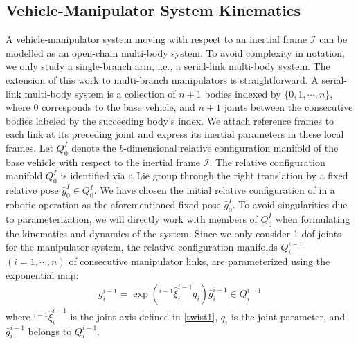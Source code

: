 \documentclass[lettersize,journal]{IEEEtran}
\def \SE {\textbf{SE}(3)}
\def  \B {\mathcal{B}}
\theoremstyle{remark}
\begin{document}
\subsection{Vehicle-Manipulator System Kinematics}\label{kinematics}
A vehicle-manipulator system moving with respect to an inertial frame $\mathcal{I}$ can be modelled as an open-chain multi-body system. To avoid complexity in notation, we only study a single-branch arm, i.e., a serial-link multi-body system. The extension of this work to multi-branch manipulators is straightforward. A serial-link multi-body system is a collection of $n+1$ bodies indexed by $\{0,1,\cdots, n\}$, where $0$ corresponds to the base vehicle, and $n+1$ joints between the consecutive bodies labeled by the succeeding body's index. %
We attach reference frames to each link at its preceding joint and express its inertial parameters in these local frames. %
Let $Q^I_0$ denote the $b$-dimensional relative configuration manifold of the base vehicle with respect to the inertial frame $\mathcal{I}$. The relative configuration manifold $Q^{I}_0$ is identified via a Lie group through the right translation by a fixed relative pose $\bar{g}^I_0{} \in Q_0^I$. %
We have chosen the initial relative configuration of in a robotic operation as the aforementioned fixed pose $\bar{g}^I_0{}$. To avoid singularities due to parameterization, we will directly work with members of $Q^I_0$ when formulating the kinematics and dynamics of the system. %
Since we only consider 1-dof joints for the manipulator system, the relative configuration manifolds $Q^{i-1}_i $ $(i=1, \cdots, n) $ of consecutive manipulator links, are parameterized using the exponential map: 
\begin{align}
g_i^{i-1}=\exp{({}^{i-1}\hat{\xi}^{i-1}_iq_i)}\bar{g}^{i-1}_i\in Q_i^{i-1}\label{expparam}
\end{align}
where ${}^{i-1}\hat{\xi}^{i-1}_i$ is the joint axis defined in \eqref{twist1}, $q_i$ is the joint parameter, and $\bar{g}^{i-1}_i$ belongs to $Q^{i-1}_i$. %
\end{document}
